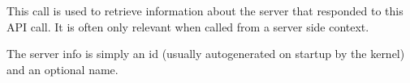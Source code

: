 This call is used to retrieve information about the server that responded to this API call. It is often only relevant
when called from a server side context.

The server info is simply an id (usually autogenerated on \Rapture startup by the kernel) and an optional name.
